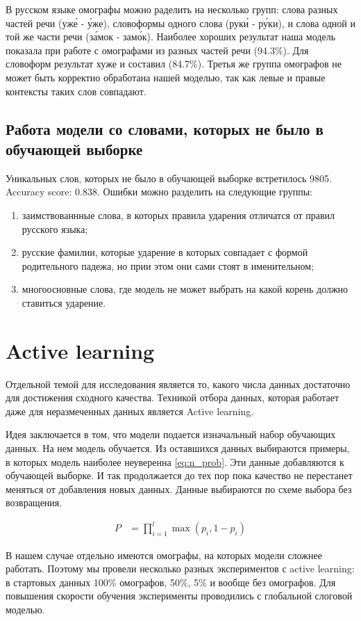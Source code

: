 \documentclass[14pt, a4paper, russian]{extreport}
\begin{document}
В русском языке омографы можно раделить на несколько групп: слова разных частей речи (уж\'{е} - \'{у}же), словоформы одного слова (рук\'{и} - р\'{у}ки), и слова одной и той же части речи (з\'{а}мок - зам\'{о}к). Наиболее хороших результат наша модель показала при работе с омографами из разных частей речи (94.3\%). Для словоформ результат хуже и составил (84.7\%). Третья же группа омографов не может быть корректно обработана нашей моделью, так как левые и правые контексты таких слов совпадают.
\subsection{Работа модели со словами, которых не было в обучающей выборке}
Уникальных слов, которых не было в обучающей выборке встретилось 9805. Accuracy score: 0.838. Ошибки можно разделить на следующие группы: 
\begin{enumerate}[  1{)} ]
	\item заимствованнные слова, в которых правила ударения отличатся от правил русского языка;
	\item русские фамилии, которые ударение в которых совпадает с формой родительного падежа, но прии этом они сами стоят в именительном;
	\item многоосновные слова, где модель не может выбрать на какой корень должно ставиться ударение.
\end{enumerate}

\section{Active learning}
Отдельной темой для исследования является то, какого числа данных достаточно для достижения сходного качества. Техникой отбора данных, которая работает даже для неразмеченных данных является Active learning.

Идея заключается в том, что модели подается изначальный набор обучающих данных. На нем модель обучается. Из оставшихся данных выбираются примеры, в которых модель наиболее неуверенна \ref{eq:n_prob}. Эти данные добавляются к обучающей выборке. И так продолжается до тех пор пока качество не перестанет меняться от добавления новых данных. Данные выбираются по схеме выбора без возвращения. 

\begin{align}
\label{eq:n_prob} P &= \prod\limits_{i=1}^l \max(p_i, 1-p_i)
\end{align}

В нашем случае отдельно имеются омографы, на которых модели сложнее работать. Поэтому мы провели несколько разных экспериментов с active learning: в стартовых данных 100\% омографов, 50\%, 5\% и вообще без омографов. Для повышения скорости обучения эксперименты проводились с  глобальной слоговой моделью. 
\end{document}
